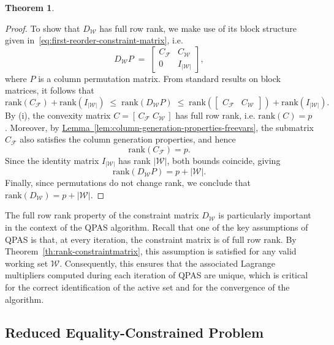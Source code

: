 \documentclass{book}
\theoremstyle{definition}
\newtheorem{theorem}{Theorem}[section]
\newcommand{\lemref}[1]{\hyperref[#1]{Lemma~\ref*{#1}}}
\newcounter{algorithm_}
\numberwithin{algorithm_}{chapter}
\begin{document}
\begin{theorem}
\begin{proof}
To show that $D_{\mathcal{W}}$ has full row rank, we make use of its block structure given in~\eqref{eq:first-reorder-constraint-matrix}, i.e.
\[
	D_{\mathcal{W}} P \;=\;
	\begin{bmatrix}
		C_{\mathcal{F}} & C_{\mathcal{W}} \\
		0 & I_{|\mathcal{W}|}
	\end{bmatrix},
\]
where $P$ is a column permutation matrix.  
From standard results on block matrices, it follows that
\[
	\mathrm{rank}(C_{\mathcal{F}}) + \mathrm{rank}(I_{|\mathcal{W}|})
	\;\leq\;
	\mathrm{rank}(D_{\mathcal{W}} P)
	\;\leq\;
	\mathrm{rank}\!\left(\begin{bmatrix} C_{\mathcal{F}} & C_{\mathcal{W}} \end{bmatrix}\right)
	+ \mathrm{rank}(I_{|\mathcal{W}|}).
\]
By (i), the convexity matrix 
$C = [\, C_{\mathcal{F}} \; C_{\mathcal{W}} \,]$ has full row rank, i.e. $\mathrm{rank}(C) = p$.  
Moreover, by \lemref{lem:column-generation-properties-freevars}, the submatrix $C_{\mathcal{F}}$ also satisfies the column generation properties, and hence
\[
	\mathrm{rank}(C_{\mathcal{F}}) = p.
\]
Since the identity matrix $I_{|\mathcal{W}|}$ has rank $|\mathcal{W}|$, both bounds coincide, giving
\[
	\mathrm{rank}(D_{\mathcal{W}} P) = p + |\mathcal{W}|.
\]
Finally, since permutations do not change rank, we conclude that $\mathrm{rank}(D_{\mathcal{W}}) = p + |\mathcal{W}|$.

\end{proof}
\end{theorem}

\medskip

The full row rank property of the constraint matrix \(D_{\mathcal{W}}\) is particularly important in the context of the QPAS algorithm. Recall that one of the key assumptions of QPAS is that, at every iteration, the constraint matrix is of full row rank. By Theorem~\ref{th:rank-constraintmatrix}, this assumption is satisfied for any valid working set \(\mathcal{W}\). Consequently, this ensures that the associated Lagrange multipliers computed during each iteration of QPAS are unique, which is critical for the correct identification of the active set and for the convergence of the algorithm.





\subsection{Reduced Equality-Constrained Problem}
\end{document}

